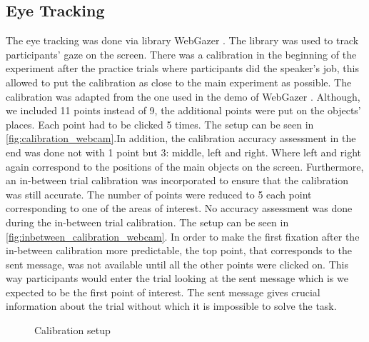 \subsection{Eye Tracking}
\label{sec:data:eyetr}
The eye tracking was done via library WebGazer \cite{webgazer}. The library was used to track participants' gaze on the screen. There was a calibration in the beginning of the experiment after the practice trials where participants did the speaker's job, this allowed to put the calibration as close to the main experiment as possible. The calibration was adapted from the one used in the demo of WebGazer \cite{webgazer}. Although, we included 11 points instead of 9, the additional points were put on the objects' places. Each point had to be clicked 5 times. The setup can be seen in \autoref{fig:calibration_webcam}.In addition, the calibration accuracy assessment in the end was done not with 1 point but 3: middle, left and right. Where left and right again correspond to the positions of the main objects on the screen. Furthermore, an in-between trial calibration was incorporated to ensure that the calibration was still accurate. The number of points were reduced to 5 each point corresponding to one of the areas of interest. No accuracy assessment was done during the in-between trial calibration. The setup can be seen in \autoref{fig:inbetween_calibration_webcam}. In order to make the first fixation after the in-between calibration more predictable, the top point, that corresponds to the sent message, was not available until all the other points were clicked on. This way participants would enter the trial looking at the sent message which is we expected to be the first point of interest. The sent message gives crucial information about the trial without which it is impossible to solve the task.

\begin{figure}
    \centering
    \caption{Calibration setup}
    \label{fig:calibration_webcam}
\end{figure}

